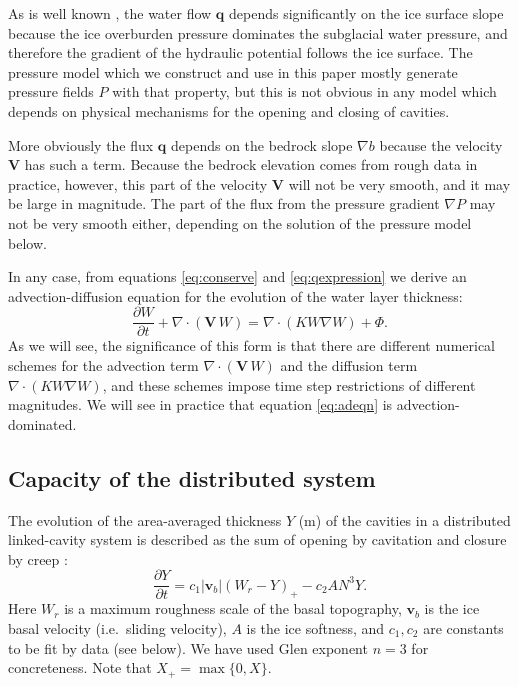 \documentclass[11pt,final]{amsart}%
\newcommand\bv{\mathbf{v}}
\newcommand\bV{\mathbf{V}}
\newcommand\bq{\mathbf{q}}
\newcommand{\Div}{\nabla\cdot}
\newcommand{\grad}{\nabla}
\begin{document}
As is well known \citep{Clarke05}, the water flow $\bq$ depends significantly on the ice surface slope because the ice overburden pressure dominates the subglacial water pressure, and therefore the gradient of the hydraulic potential follows the ice surface.  The pressure model which we construct and use in this paper mostly generate pressure fields $P$ with that property, but this is not obvious in any model which depends on physical mechanisms for the opening and closing of cavities.

More obviously the flux $\bq$ depends on the bedrock slope $\grad b$ because the velocity $\bV$ has such a term.  Because the bedrock elevation comes from rough data in practice, however, this part of the velocity $\bV$ will not be very smooth, and it may be large in magnitude.  The part of the flux from the pressure gradient $\grad P$ may not be very smooth either, depending on the solution of the pressure model below.

In any case, from equations \eqref{eq:conserve} and \eqref{eq:qexpression} we derive an advection-diffusion equation \citep{HundsdorferVerwer2010} for the evolution of the water layer thickness:
\begin{equation} \label{eq:adeqn}
  \frac{\partial W}{\partial t} + \Div\left(\bV\, W\right) = \Div \left(K W \grad W\right) + \Phi.
\end{equation}
As we will see, the significance of this form is that there are different numerical schemes for the advection term $\Div\left(\bV\, W\right)$ and the diffusion term $\Div \left(K W \grad W\right)$, and these schemes impose time step restrictions of different magnitudes.  We will see in practice that equation \eqref{eq:adeqn} is advection-dominated.

\subsection*{Capacity of the distributed system}  The evolution of the area-averaged thickness $Y$ (m) of the cavities in a distributed linked-cavity system \citep{Schoofetal2012} is described as the sum of opening by cavitation and closure by creep \citep{Hewitt2011}:
\begin{equation}
\frac{\partial Y}{\partial t} = c_1 |\bv_b| (W_r - Y)_+ - c_2 A N^3 Y. \label{eq:capacity}
\end{equation}
Here $W_r$ is a maximum roughness scale of the basal topography, $\bv_b$ is the ice basal velocity (i.e.~sliding velocity), $A$ is the ice softness, and $c_1,c_2$ are constants to be fit by data (see below).  We have used Glen exponent $n=3$ for concreteness.  Note that $X_+= \max\{0,X\}$.
\end{document}
